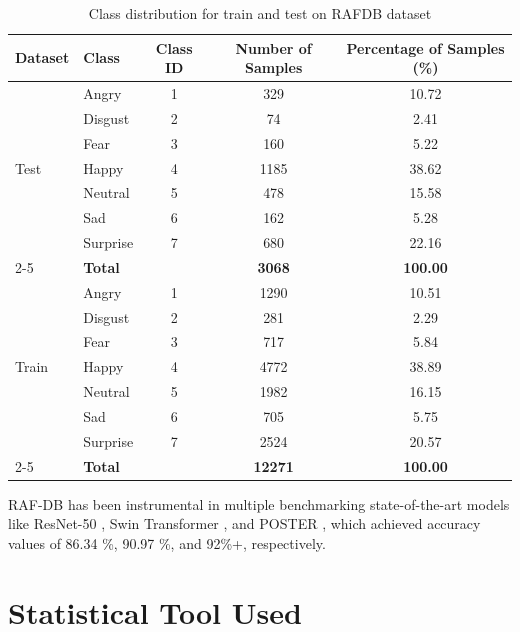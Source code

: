 \begin{table}[H]
\centering
\caption{Class distribution for train and test  on RAFDB dataset}
\label{tab:class-distribution}
\begin{tabular}{llccc}
\hline
\textbf{Dataset} & \textbf{Class} & \textbf{Class ID} & \textbf{Number of Samples} & \textbf{Percentage of Samples (\%)} \\
\hline
\multirow{7}{*}{Test} 
 & Angry    & 1 & 329  & 10.72 \\
 & Disgust  & 2 & 74   & 2.41  \\
 & Fear     & 3 & 160  & 5.22  \\
 & Happy    & 4 & 1185 & 38.62 \\
 & Neutral  & 5 & 478  & 15.58 \\
 & Sad      & 6 & 162  & 5.28  \\
 & Surprise & 7 & 680  & 22.16 \\
\cline{2-5}
 & \textbf{Total} &  & \textbf{3068} & \textbf{100.00} \\
\hline
\multirow{7}{*}{Train} 
 & Angry    & 1 & 1290 & 10.51 \\
 & Disgust  & 2 & 281  & 2.29  \\
 & Fear     & 3 & 717  & 5.84  \\
 & Happy    & 4 & 4772 & 38.89 \\
 & Neutral  & 5 & 1982 & 16.15 \\
 & Sad      & 6 & 705  & 5.75  \\
 & Surprise & 7 & 2524 & 20.57 \\
\cline{2-5}
 & \textbf{Total} &  & \textbf{12271} & \textbf{100.00} \\
\hline
\end{tabular}
\end{table}

RAF-DB has been instrumental in multiple benchmarking state-of-the-art models like ResNet-50 \cite{he_deep_2015}, Swin Transformer \cite{liu_swin_2021}, and \gls{POSTER} \cite{zheng_poster_2022}, which achieved accuracy values of 86.34 \%, 90.97 \%, and 92\%+, respectively.



\section{Statistical Tool Used}


